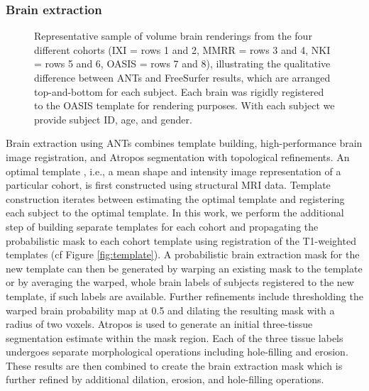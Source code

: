 \subsubsection{Brain extraction}

\begin{figure}
  \vspace{0mm}
  \caption{Representative sample of volume brain renderings from the four
  different cohorts (IXI = rows 1 and 2, MMRR = rows 3 and 4, 
  NKI = rows 5 and 6, OASIS = rows 7 and 8),
  illustrating the qualitative difference between ANTs and FreeSurfer 
  results, which are arranged top-and-bottom for each subject.  Each brain was rigidly
  registered to the OASIS template for rendering purposes.  With each subject
  we provide subject ID, age, and gender.
  }
  \label{fig:brainExtraction}
\end{figure}

Brain extraction using ANTs combines template building, high-performance
brain image registration, and Atropos segmentation with topological refinements.
An optimal template \citep{avants2010}, i.e., a mean shape and intensity image 
representation of a particular cohort,  is first constructed using structural 
MRI data.  Template construction iterates between estimating
the optimal template and registering each subject to the optimal template.
In this work, we perform the additional step of building separate templates
for each cohort and propagating the probabilistic mask to each cohort template
using registration of the T1-weighted templates (cf Figure \ref{fig:template}).
A probabilistic brain extraction mask for the new template can then be generated 
by warping an existing mask to the template or by averaging the warped, whole brain 
labels of subjects registered to the new template, if such labels are available.
Further refinements include thresholding the warped brain probability map
at 0.5 and dilating the resulting mask with a radius of two voxels.  Atropos is used
to generate an initial three-tissue segmentation estimate within the mask
region.  Each of the three tissue labels undergoes separate morphological  
operations including hole-filling and erosion.  These results are then combined
to create the brain extraction mask which is further refined by additional 
dilation, erosion, and hole-filling operations.  

